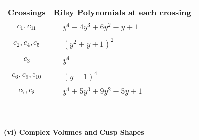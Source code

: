 \documentclass[1p]{elsarticle_modified}
\theoremstyle{definition}
\begin{document}
\begin{tabular}{m{50pt}|m{274pt}}
Crossings & \hspace{64pt}Riley Polynomials at each crossing \\
\hline $$\begin{aligned}c_{1},c_{11}\end{aligned}$$&$\begin{aligned}
&y^4-4 y^3+6 y^2- y+1
\end{aligned}$\\
\hline $$\begin{aligned}c_{2},c_{4},c_{5}\end{aligned}$$&$\begin{aligned}
&(y^2+y+1)^2
\end{aligned}$\\
\hline $$\begin{aligned}c_{3}\end{aligned}$$&$\begin{aligned}
&y^4
\end{aligned}$\\
\hline $$\begin{aligned}c_{6},c_{9},c_{10}\end{aligned}$$&$\begin{aligned}
&(y-1)^4
\end{aligned}$\\
\hline $$\begin{aligned}c_{7},c_{8}\end{aligned}$$&$\begin{aligned}
&y^4+5 y^3+9 y^2+5 y+1
\end{aligned}$\\
\hline
\end{tabular}\\~\\
\newpage\flushleft \textbf{(vi) Complex Volumes and Cusp Shapes}
\end{document}

